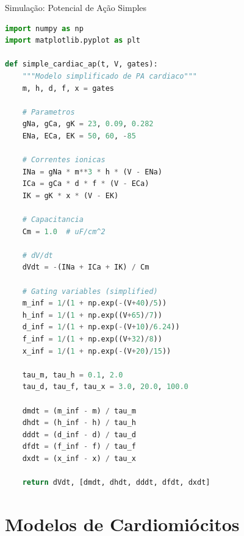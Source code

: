 \begin{frame}[fragile]{Simulação: Potencial de Ação Simples}
\begin{lstlisting}[language=Python, caption=Modelo simplificado de PA cardíaco, basicstyle=\ttfamily\footnotesize]
import numpy as np
import matplotlib.pyplot as plt

def simple_cardiac_ap(t, V, gates):
    """Modelo simplificado de PA cardiaco"""
    m, h, d, f, x = gates

    # Parametros
    gNa, gCa, gK = 23, 0.09, 0.282
    ENa, ECa, EK = 50, 60, -85

    # Correntes ionicas
    INa = gNa * m**3 * h * (V - ENa)
    ICa = gCa * d * f * (V - ECa)
    IK = gK * x * (V - EK)

    # Capacitancia
    Cm = 1.0  # uF/cm^2

    # dV/dt
    dVdt = -(INa + ICa + IK) / Cm

    # Gating variables (simplified)
    m_inf = 1/(1 + np.exp(-(V+40)/5))
    h_inf = 1/(1 + np.exp((V+65)/7))
    d_inf = 1/(1 + np.exp(-(V+10)/6.24))
    f_inf = 1/(1 + np.exp((V+32)/8))
    x_inf = 1/(1 + np.exp(-(V+20)/15))

    tau_m, tau_h = 0.1, 2.0
    tau_d, tau_f, tau_x = 3.0, 20.0, 100.0

    dmdt = (m_inf - m) / tau_m
    dhdt = (h_inf - h) / tau_h
    dddt = (d_inf - d) / tau_d
    dfdt = (f_inf - f) / tau_f
    dxdt = (x_inf - x) / tau_x

    return dVdt, [dmdt, dhdt, dddt, dfdt, dxdt]
\end{lstlisting}
\end{frame}

\section{Modelos de Cardiomiócitos}

